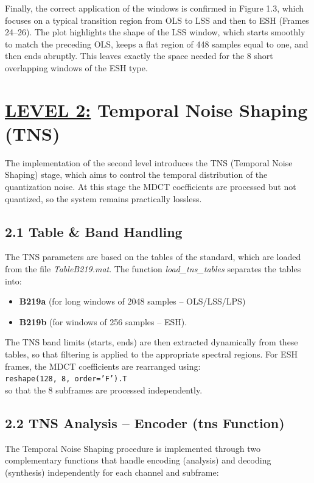 \documentclass[11pt,twocolumn]{article}
\newcommand{\fn}[1]{\textit{#1}}
\newcommand{\level}[2]{\section*{\underline{LEVEL #1:} #2}}
\newcommand{\sub}[1]{\subsection*{#1}}
\begin{document}
Finally, the correct application of the windows is confirmed in Figure 1.3, which focuses on a typical transition region from OLS to LSS and then to ESH (Frames 24--26). The plot highlights the shape of the LSS window, which starts smoothly to match the preceding OLS, keeps a flat region of 448 samples equal to one, and then ends abruptly. This leaves exactly the space needed for the 8 short overlapping windows of the ESH type.

\level{2}{Temporal Noise Shaping (TNS)}

The implementation of the second level introduces the TNS (Temporal Noise Shaping) stage, which aims to control the temporal distribution of the quantization noise. At this stage the MDCT coefficients are processed but not quantized, so the system remains practically lossless.

\sub{2.1 Table \& Band Handling}
The TNS parameters are based on the tables of the standard, which are loaded from the file \fn{TableB219.mat}. The function \fn{load\_tns\_tables} separates the tables into:
\begin{itemize}
  \item \textbf{B219a} (for long windows of 2048 samples -- OLS/LSS/LPS)
  \item \textbf{B219b} (for windows of 256 samples -- ESH).
\end{itemize}
The TNS band limits (starts, ends) are then extracted dynamically from these tables, so that filtering is applied to the appropriate spectral regions. For ESH frames, the MDCT coefficients are rearranged using:\\
\texttt{reshape(128, 8, order='F').T}\\
so that the 8 subframes are processed independently.

\sub{2.2 TNS Analysis -- Encoder (tns Function)}
The Temporal Noise Shaping procedure is implemented through two complementary functions that handle encoding (analysis) and decoding (synthesis) independently for each channel and subframe:
\end{document}
